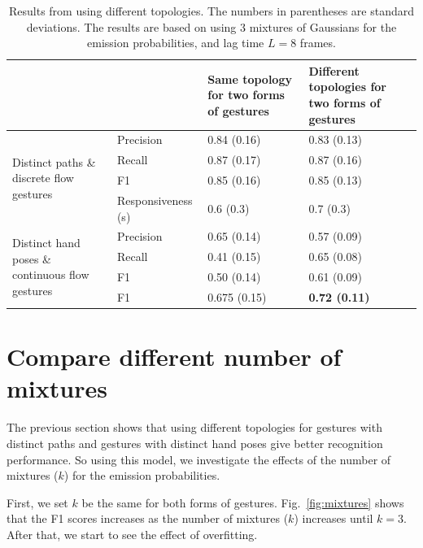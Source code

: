 \begin{table}[t]
\centering
\begin{tabular}{|l|l|p{3cm}|p{3cm}|}
\hline
& & Same topology for two forms of gestures & Different topologies for two forms
of gestures \\
\hline
\multirow{4}{4cm}{Distinct paths \& discrete flow gestures} 
& Precision & 0.84 (0.16) & 0.83 (0.13) \\
\cline{2-4}
& Recall & 0.87 (0.17) & 0.87 (0.16)\\
\cline{2-4}
& F1 & 0.85 (0.16) &  0.85 (0.13)\\
\cline{2-4}
& Responsiveness (s) & 0.6 (0.3) & 0.7 (0.3) \\
\hline
\multirow{4}{4.5cm}{Distinct hand poses \& continuous flow gestures}
& Precision & 0.65 (0.14) & 0.57 (0.09) \\
\cline{2-4}
& Recall & 0.41 (0.15) & 0.65 (0.08) \\
\cline{2-4}
& F1 & 0.50 (0.14) & 0.61 (0.09) \\
\hline
\textbf{Average} & F1 & 0.675 (0.15) & \textbf{0.72 (0.11)} \\
\hline
\end{tabular}
\caption{Results from using different topologies. The numbers in parentheses are
standard deviations. The results are based on using 3 mixtures of Gaussians
for the emission probabilities, and lag time $L = 8$ frames.}
\label{tab:result}
\end{table}

\section{Compare different number of mixtures}
The previous section shows that using different topologies for gestures
with distinct paths and gestures with distinct hand poses give better
recognition performance. So using this model, we investigate the effects
of the number of mixtures ($k$) for the emission probabilities.

First, we set $k$ be the same for both forms of gestures.
Fig.~\ref{fig:mixtures} shows that the F1 scores increases as the number of mixtures ($k$) increases until $k=3$.
After that, we start to see the effect of overfitting.

